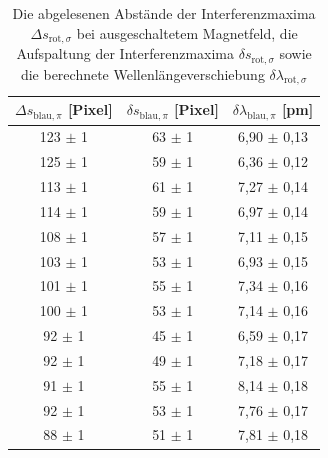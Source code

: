             \FloatBarrier

              \begin{table}[h]
                \centering
                \caption{Die abgelesenen Abstände der Interferenzmaxima $\Delta s_{\text{rot}, \sigma}$ bei ausgeschaltetem Magnetfeld, die Aufspaltung der Interferenzmaxima $\delta s_{\text{rot}, \sigma}$ sowie die berechnete Wellenlängeverschiebung $\delta \lambda_{\text{rot}, \sigma}$}
                \label{tab:blau_pi}
              
                \begin{tabular}{c c c}
                  \toprule
                  {$\Delta s_{\text{blau}, \pi}$ [Pixel]} & {$\delta s_{\text{blau}, \pi}$ [Pixel]} & {$\delta \lambda_{\text{blau}, \pi}$ [\si{\pico\metre}]} \\ 
                  \midrule
                   123 $\pm$ 1  &   63 $\pm$ 1   &   6,90 $\pm$ 0,13   \\
                   125 $\pm$ 1  &   59 $\pm$ 1   &   6,36 $\pm$ 0,12   \\
                   113 $\pm$ 1  &   61 $\pm$ 1   &   7,27 $\pm$ 0,14   \\
                   114 $\pm$ 1  &   59 $\pm$ 1   &   6,97 $\pm$ 0,14   \\
                   108 $\pm$ 1  &   57 $\pm$ 1   &   7,11 $\pm$ 0,15   \\
                   103 $\pm$ 1  &   53 $\pm$ 1   &   6,93 $\pm$ 0,15   \\
                   101 $\pm$ 1  &   55 $\pm$ 1   &   7,34 $\pm$ 0,16   \\
                   100 $\pm$ 1  &   53 $\pm$ 1   &   7,14 $\pm$ 0,16   \\
                   92  $\pm$ 1  &   45 $\pm$ 1   &   6,59 $\pm$ 0,17   \\
                   92  $\pm$ 1  &   49 $\pm$ 1   &   7,18 $\pm$ 0,17   \\
                   91  $\pm$ 1  &   55 $\pm$ 1   &   8,14 $\pm$ 0,18   \\
                   92  $\pm$ 1  &   53 $\pm$ 1   &   7,76 $\pm$ 0,17   \\
                   88  $\pm$ 1  &   51 $\pm$ 1   &   7,81 $\pm$ 0,18   \\

                  \bottomrule
                \end{tabular}
              \end{table}
              \FloatBarrier


